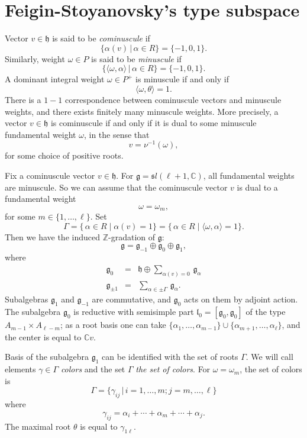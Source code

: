 \documentclass[a4paper, 10pt,oneside]{amsart}
\begin{document}
\section{Feigin-Stoyanovsky's type subspace}

Vector $v\in{{\mathfrak h}}$ is said to be \emph{cominuscule} if
$$\{\alpha(v)\,|\,\alpha \in R\}=\{-1,0,1\}.$$
Similarly, weight $\omega\in P$ is said to be \emph{minuscule} if
$$\{ \langle\omega,\alpha\rangle \,|\,\alpha \in R\}=\{-1,0,1\}.$$
A dominant integral weight $\omega\in P^+$
is minuscule if and only if
$$\langle\omega,\theta\rangle = 1.$$
There is a $1-1$ correspondence between cominuscule vectors and minuscule weights, and there exists finitely many minuscule weights. More precisely,
a vector $v\in{{\mathfrak h}}$ is cominuscule if and only if it is dual to some
minuscule fundamental weight $\omega$, in the sense that
$$v=\nu^{-1}(\omega),$$
for some choice of positive roots.

Fix a cominuscule vector $v\in{{\mathfrak h}}$. For ${{\mathfrak g}}={{\mathfrak sl}}(\ell+1,{{\mathbb C}})$, all
 fundamental weights are minuscule. So we can assume that the
cominuscule vector $v$ is dual to a fundamental weight
$$\omega=\omega_m,$$ for some $m \in \{1,\dots, \ell\}$.
Set
$$\Gamma =
\{\,\alpha \in R \mid \alpha(v) = 1\}=\{\,\alpha \in R \mid \langle\omega, \alpha\rangle = 1\}.$$ Then we have the induced
$\mathbb Z$-gradation of ${\mathfrak g}$:
\begin{equation}
\label{GDecomp_jed} \mathfrak g  =
\mathfrak g_{-1} \oplus \mathfrak g_0 \oplus \mathfrak g_1, \end{equation}
where
\begin{eqnarray*} {\mathfrak g}_0 & = & {\mathfrak h} \oplus
\sum_{\alpha(v)=0}\, {\mathfrak g}_\alpha
\\
 \displaystyle {\mathfrak g}_{\pm1} & = &
\sum_{\alpha \in \pm \Gamma}\, {\mathfrak g}_\alpha.
\end{eqnarray*}
Subalgebras ${\mathfrak g}_1$ and ${\mathfrak g}_{-1}$ are
commutative, and ${\mathfrak g}_0$ acts on them by adjoint action.
The subalgebra ${\mathfrak g}_0$ is reductive with semisimple part
${\mathfrak l}_0=[{\mathfrak g}_0,{\mathfrak g}_0]$ of the type
$A_{m-1}\times A_{\ell-m}$; as a root basis one can take
$\{\alpha_1,\dots,\alpha_{m-1}\}\cup\{\alpha_{m+1},\dots,\alpha_\ell\}$,
and the center is equal to ${{\mathbb C}} v$.

Basis of the subalgebra ${\mathfrak g}_1$ can be identified with the set
of roots $\Gamma$. We will call elements  $\gamma\in\Gamma$ {\em
colors} and the set $\Gamma$ {\em the  set of colors}.
For $\omega=\omega_m$, the set of colors is
$$\Gamma=\{\gamma_{ij}\,|\, i=1,\ldots,m; j=m,\ldots,\ell\}$$
where
\begin{equation}\label{GammaIJ_jed} \gamma_{ij}=\alpha_i+\cdots+\alpha_m+\cdots+\alpha_j.\end{equation}
The maximal root $\theta$ is equal to $\gamma_{1\ell}$.
\end{document}
